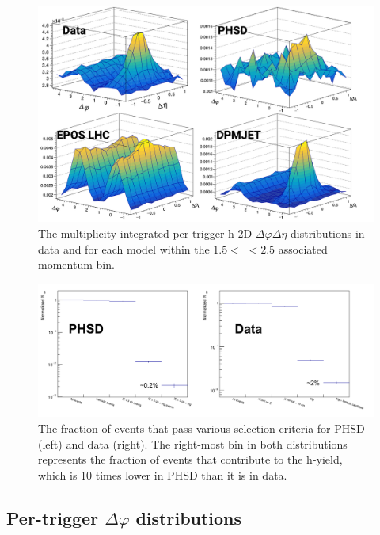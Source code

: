 \begin{figure}[ht]
\centering
\includegraphics[width=\textwidth]{figures/results/h_lambda_2d_modelcomp.png}
\caption{The multiplicity-integrated per-trigger h-\lmb 2D $\Delta\varphi\Delta\eta$ distributions in data and for each model within the $1.5 <$ \pt $< 2.5$ \GeVc associated momentum bin.}
\label{fig:h_lambda_2d_model}
\end{figure}
\clearpage

\begin{figure}[ht]
\centering
\includegraphics[width=\textwidth]{figures/results/phsd_woes.png}
\caption{The fraction of events that pass various selection criteria for PHSD (left) and data (right). The right-most bin in both distributions represents the fraction of events that contribute to the h-\lmb yield, which is 10 times lower in PHSD than it is in data.}
\label{fig:phsd_woes}
\end{figure}


\subsection{Per-trigger $\Delta\varphi$ distributions}
\label{sec:model_1d_correlations}

